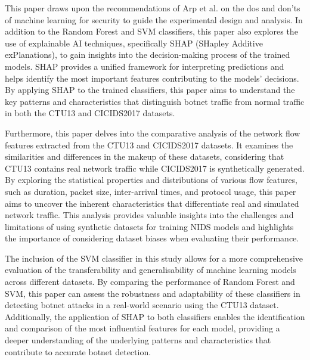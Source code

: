 This paper draws upon the recommendations of Arp et al.\cite{arp2022and} on the dos and don'ts of machine learning for security to guide the experimental design and analysis. In addition to the Random Forest and SVM classifiers, this paper also explores the use of explainable AI techniques, specifically SHAP (SHapley Additive exPlanations)\cite{lundberg2017unified}, to gain insights into the decision-making process of the trained models. SHAP provides a unified framework for interpreting predictions and helps identify the most important features contributing to the models' decisions. By applying SHAP to the trained classifiers, this paper aims to understand the key patterns and characteristics that distinguish botnet traffic from normal traffic in both the CTU13 and CICIDS2017 datasets.

Furthermore, this paper delves into the comparative analysis of the network flow features extracted from the CTU13 and CICIDS2017 datasets. It examines the similarities and differences in the makeup of these datasets, considering that CTU13 contains real network traffic while CICIDS2017 is synthetically generated. By exploring the statistical properties and distributions of various flow features, such as duration, packet size, inter-arrival times, and protocol usage, this paper aims to uncover the inherent characteristics that differentiate real and simulated network traffic. This analysis provides valuable insights into the challenges and limitations of using synthetic datasets for training NIDS models and highlights the importance of considering dataset biases when evaluating their performance.

The inclusion of the SVM classifier in this study allows for a more comprehensive evaluation of the transferability and generalisability of machine learning models across different datasets. By comparing the performance of Random Forest and SVM, this paper can assess the robustness and adaptability of these classifiers in detecting botnet attacks in a real-world scenario using the CTU13 dataset. Additionally, the application of SHAP to both classifiers enables the identification and comparison of the most influential features for each model, providing a deeper understanding of the underlying patterns and characteristics that contribute to accurate botnet detection.

